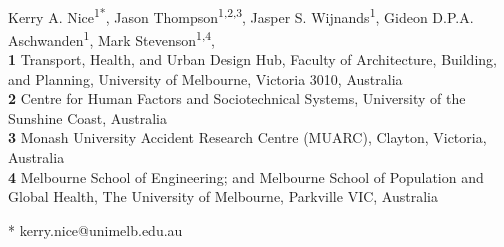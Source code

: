 \documentclass[10pt,letterpaper]{article}
\date{}
\begin{document}
\vspace*{0.2in}



\begin{flushleft}
{\Large
\textbf{} %
}
\newline
\\
Kerry A. Nice\textsuperscript{1*},
Jason Thompson\textsuperscript{1,2,3},
Jasper S. Wijnands\textsuperscript{1},
Gideon D.P.A. Aschwanden\textsuperscript{1},
Mark Stevenson\textsuperscript{1,4},
\\
\bigskip
\textbf{1} Transport, Health, and Urban Design Hub, Faculty of Architecture, Building, and Planning, University of Melbourne, Victoria 3010, Australia
\\
\textbf{2} Centre for Human Factors and Sociotechnical Systems, University of the Sunshine Coast, Australia
\\
\textbf{3} Monash University Accident Research Centre (MUARC), Clayton, Victoria, Australia
\\
\textbf{4} Melbourne School of Engineering; and Melbourne School of Population and Global Health, The University of Melbourne, Parkville VIC, Australia
\\
\bigskip

% 
%





* kerry.nice@unimelb.edu.au

\end{flushleft}
\end{document}
